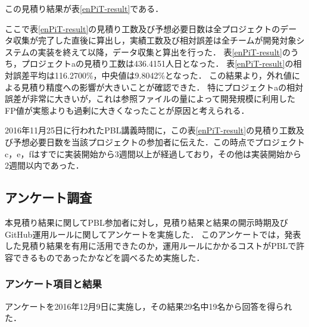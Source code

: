 \documentclass{compsoft}
\begin{document}
この見積り結果が表\ref{enPiT-result}である．
\begin{table}[htb]
\centering
\caption{適用実験の見積り結果}
\label{enPiT-result}
\end{table}
ここで表\ref{enPiT-result}の見積り工数及び予想必要日数は全プロジェクトのデータ収集が完了した直後に算出し，実績工数及び相対誤差は全チームが開発対象システムの実装を終えて以降，データ収集と算出を行った．
表\ref{enPiT-result}のうち，プロジェクトaの見積り工数は436.4151人日となった．
表\ref{enPiT-result}の相対誤差平均は116.2700\%，中央値は9.8042\%となった．
この結果より，外れ値による見積り精度への影響が大きいことが確認できた．
特にプロジェクトaの相対誤差が非常に大きいが，これは参照ファイルの量によって開発規模に利用したFP値が実態よりも過剰に大きくなったことが原因と考えられる．

2016年11月25日に行われたPBL講義時間に，この表\ref{enPiT-result}の見積り工数及び予想必要日数を当該プロジェクトの参加者に伝えた．この時点でプロジェクトc，e，fはすでに実装開始から3週間以上が経過しており，その他は実装開始から2週間以内であった．

\subsection{アンケート調査} \label{quest}
本見積り結果に関してPBL参加者に対し，見積り結果と結果の開示時期及びGitHub運用ルールに関してアンケートを実施した．
このアンケートでは，発表した見積り結果を有用に活用できたのか，運用ルールにかかるコストがPBLで許容できるものであったかなどを調べるため実施した．

\subsubsection{アンケート項目と結果} \label{quest-detail}
アンケートを2016年12月9日に実施し，その結果29名中19名から回答を得られた．
\end{document}
